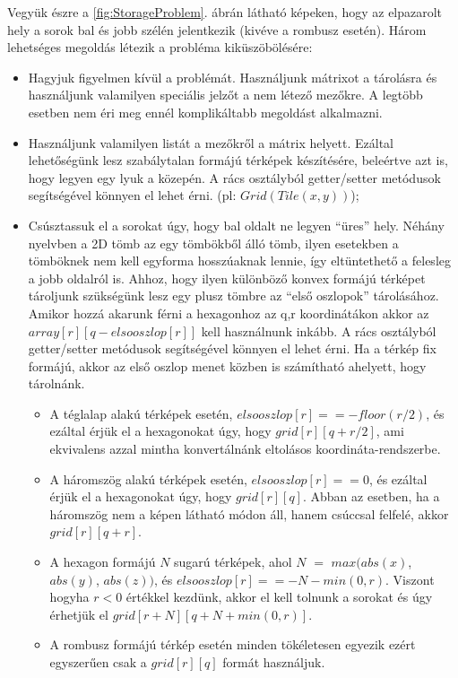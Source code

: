 \noindent Vegyük észre a \ref{fig:StorageProblem}. ábrán látható képeken, hogy az elpazarolt hely a sorok bal és jobb szélén jelentkezik (kivéve a rombusz esetén). Három lehetséges megoldás létezik a probléma kiküszöbölésére:
\begin{itemize}
\item Hagyjuk figyelmen kívül a problémát. Használjunk mátrixot a tárolásra és használjunk valamilyen speciális jelzőt a nem létező mezőkre. A legtöbb esetben nem éri meg ennél komplikáltabb megoldást alkalmazni.
\item Használjunk valamilyen listát a mezőkről a mátrix helyett. Ezáltal lehetőségünk lesz szabálytalan formájú térképek készítésére, beleértve azt is, hogy legyen egy lyuk a közepén. A rács osztályból getter/setter metódusok segítségével könnyen el lehet érni. (pl: $Grid(Tile(x,y))$);
\item Csúsztassuk el a sorokat úgy, hogy bal oldalt ne legyen “üres” hely. Néhány nyelvben a 2D tömb az egy tömbökből álló tömb, ilyen esetekben a tömböknek nem kell egyforma hosszúaknak lennie, így eltüntethető a felesleg a jobb oldalról is.
\newline
\newline Ahhoz, hogy ilyen különböző konvex formájú térképet tároljunk szükségünk lesz egy plusz tömbre az “első oszlopok” tárolásához. Amikor hozzá akarunk férni a hexagonhoz az q,r koordinátákon akkor az $array[r][q - elsooszlop[r]]$ kell használnunk inkább. A rács osztályból getter/setter metódusok segítségével könnyen el lehet érni.
\newline
\newline Ha a térkép fix formájú, akkor az első oszlop menet közben is számítható ahelyett, hogy tárolnánk.
\begin{itemize}
\item A téglalap alakú térképek esetén, $elsooszlop[r] == -floor(r/2)$, és ezáltal érjük el a hexagonokat úgy, hogy $grid[r][q + r/2]$, ami ekvivalens azzal mintha konvertálnánk eltolásos koordináta-rendszerbe.
\item A háromszög alakú térképek esetén, $elsooszlop[r] == 0$, és ezáltal érjük el a hexagonokat úgy, hogy $grid[r][q]$. Abban az esetben, ha a háromszög nem a képen látható módon áll, hanem csúccsal felfelé, akkor $grid[r][q + r]$.
\item A hexagon formájú $N$ sugarú térképek, ahol $N$ $=$ $max(abs(x)$, $abs(y)$, $abs(z))$, és $elsooszlop[r] == -N - min(0, r)$. Viszont hogyha $r < 0$ értékkel kezdünk, akkor el kell tolnunk a sorokat és úgy érhetjük el $grid[r + N][q + N + min(0, r)]$.
\item A rombusz formájú térkép esetén minden tökéletesen egyezik ezért egyszerűen csak a $grid[r][q]$ formát használjuk.
\end{itemize}
\end{itemize}

